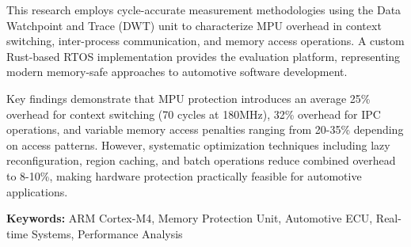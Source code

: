 \documentclass[12pt,a4paper,oneside]{report}
\begin{document}
This research employs cycle-accurate measurement methodologies using the Data Watchpoint and Trace (DWT) unit to characterize MPU overhead in context switching, inter-process communication, and memory access operations. A custom Rust-based RTOS implementation provides the evaluation platform, representing modern memory-safe approaches to automotive software development.

Key findings demonstrate that MPU protection introduces an average 25\% overhead for context switching (70 cycles at 180MHz), 32\% overhead for IPC operations, and variable memory access penalties ranging from 20-35\% depending on access patterns. However, systematic optimization techniques including lazy reconfiguration, region caching, and batch operations reduce combined overhead to 8-10\%, making hardware protection practically feasible for automotive applications.

\textbf{Keywords:} ARM Cortex-M4, Memory Protection Unit, Automotive ECU, Real-time Systems, Performance Analysis
\end{document}
